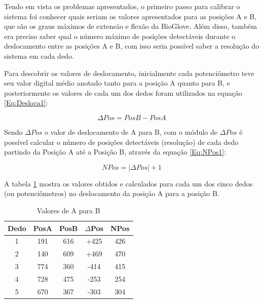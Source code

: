 \documentclass[
	12pt,				%
	openright,			%
	oneside,			%
	a4paper,			%
	english,			%
	brazil				%
	]{abntex2}
\begin{document}

		Tendo em vista os problemas apresentados, o primeiro passo para calibrar o sistema foi conhecer quais seriam os valores apresentados para as posições A e B, que são os graus máximos de extensão e flexão da BioGlove. Além disso, também era preciso saber qual o número máximo de posições detectáveis durante o deslocamento entre as posições A e B, com isso seria possível saber a resolução do sistema em cada dedo.

		Para descobrir os valores de deslocamento, inicialmente cada potenciômetro teve seu valor digital médio anotado tanto para a posição A quanto para B, e posteriormente os valores de cada um dos dedos foram utilizados na equação \ref{Eq:Desloca1}:

	\begin{equation}
			\Delta Pos 	= Pos B 	- 	Pos A
		\label{Eq:Desloca1}
	\end{equation}

		Sendo $\Delta Pos$ o valor de deslocamento de A para B, com o módulo de $\Delta Pos$ é possível calcular o número de posições detectáveis (resolução) de cada dedo partindo da Posição A até a Posição B, através da equação \ref{Eq:NPos1}:

	\begin{equation}
			NPos = |\Delta Pos| + 1
		\label{Eq:NPos1}
	\end{equation}

		A tabela \ref{Tab:deltapos} mostra os valores obtidos e calculados para cada um dos cinco dedos (ou potenciômetros) no deslocamento da posição A para a posição B.


	\begin{table}[H]
  	\centering
		\caption{Valores de A para B}
    \begin{tabular}{c|cccc}
      \midrule
			Dedo	& PosA	& PosB	& $\Delta$Pos	& NPos	\\
      \midrule
			1 		& 191 	& 616 	& 		+425 		&	426		\\
			2 		& 140 	& 609 	& 		+469 		&	470		\\
			3 		& 774 	& 360 	& 		-414 		&	415		\\
			4 		& 728 	& 475 	& 		-253 		&	254		\\
			5 		& 670 	& 367 	& 		-303 		&	304		\\      
      \midrule
    \end{tabular}
    \label{Tab:deltapos}
	\end{table}
		
\end{document}
